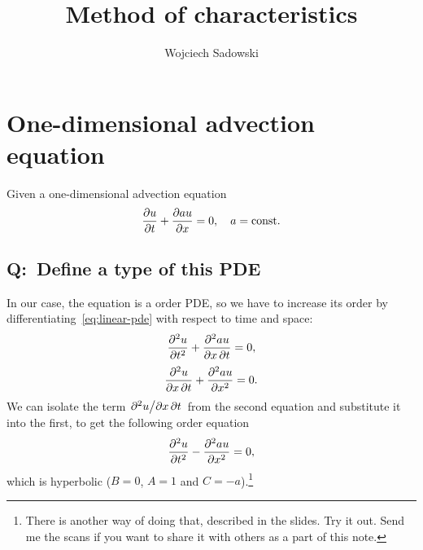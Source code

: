 \documentclass[justified, nobib, a4page]{tufte-handout}
\title{Method of characteristics}
\author[Wojciech Sadowski]{Wojciech Sadowski}
\newcommand{\Q}[1]{\subsection{Q:~{#1}}}
\begin{document}
\maketitle%

\tableofcontents
\section{One-dimensional advection equation}
Given a one-dimensional advection equation
\begin{equation}
	\pdv{u}{t} + \pdv{au}{x} = 0, \quad a = \mathrm{const.}{}
	\label{eq:linear-pde}
\end{equation}

\Q{Define a type of this PDE}

In our case, the equation is a  order PDE, so we have to increase its
order
by differentiating~\cref{eq:linear-pde} with respect to time and space:
\[
	\pdv[order=2]{u}{t} + \pdv{au}{x,t} = 0,
\]
\[
	\pdv{u}{x,t} + \pdv[order=2]{au}{x} = 0.
\]
We can isolate the term \(\pdv{u}/{x,t}\) from the second equation and substitute
it into the first, to get the following  order equation
\[
	\pdv[order=2]{u}{t} - \pdv[order=2]{au}{x} = 0,
\]
which is hyperbolic (\(B = 0\), \(A=1\) and \(C=-a\)).\footnote{
	There is another way of doing that, described in the  slides. Try
	it out. Send me the scans if you want to share it with others as a part of
	this note.}
\end{document}
